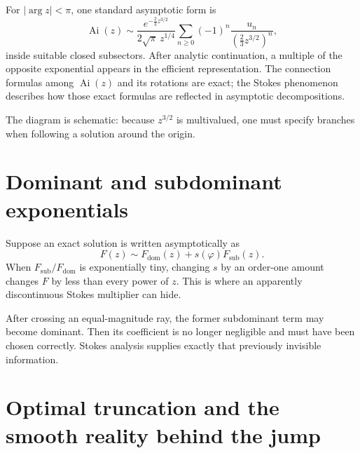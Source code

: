 \documentclass[11pt,openany]{book}
\theoremstyle{definition}
\theoremstyle{plain}
\theoremstyle{remark}
\newcommand{\asym}{\sim}
\DeclareMathOperator{\Ai}{Ai}
\begin{document}
For $|\arg z|<\pi$, one standard asymptotic form is
\begin{equation}\label{eq:airy-ai-asymptotic}
 \Ai(z)\asym
 \frac{e^{-\frac23z^{3/2}}}{2\sqrt\pi\,z^{1/4}}
 \sum_{n\ge0}(-1)^n\frac{u_n}{(\frac23z^{3/2})^n},
\end{equation}
inside suitable closed subsectors. After analytic continuation, a multiple of the opposite exponential appears in the efficient representation. The connection formulas among $\Ai(z)$ and its rotations are exact; the Stokes phenomenon describes how those exact formulas are reflected in asymptotic decompositions.

\begin{center}
\end{center}

The diagram is schematic: because $z^{3/2}$ is multivalued, one must specify branches when following a solution around the origin.

\section{Dominant and subdominant exponentials}

Suppose an exact solution is written asymptotically as
\[
 F(z)\asym F_{\mathrm{dom}}(z)
 +s(\varphi)F_{\mathrm{sub}}(z).
\]
When $F_{\mathrm{sub}}/F_{\mathrm{dom}}$ is exponentially tiny, changing $s$ by an order-one amount changes $F$ by less than every power of $z$. This is where an apparently discontinuous Stokes multiplier can hide.

After crossing an equal-magnitude ray, the former subdominant term may become dominant. Then its coefficient is no longer negligible and must have been chosen correctly. Stokes analysis supplies exactly that previously invisible information.

\section{Optimal truncation and the smooth reality behind the jump}
\end{document}

